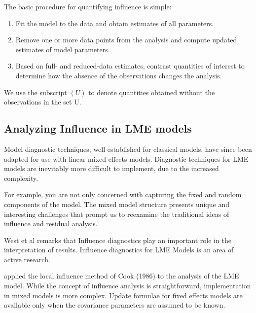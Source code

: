 \documentclass[12pt, a4paper]{report}
\theoremstyle{plain}
\theoremstyle{definition}
\theoremstyle{remark}
\begin{document}
	
	The basic procedure for quantifying influence is simple:
	\begin{enumerate}
		\item Fit the model to the data and obtain estimates of all parameters.
		\item Remove one or more data points from the analysis and compute updated estimates of model parameters.
		\item Based on full- and reduced-data estimates, contrast quantities of interest to determine how the absence
		of the observations changes the analysis.
	\end{enumerate}	
	
	
	We use the subscript $(U)$ to denote quantities obtained without the observations in the set U. 

\subsection{Analyzing Influence in LME models}

Model diagnostic techniques, well established for classical models, have since been adapted for use with linear mixed effects models. Diagnostic techniques for LME models are inevitably more difficult to implement, due to the increased complexity.



For example, you are not only concerned with capturing the fixed and random components of the model. The mixed model structure presents unique and interesting challenges that prompt us to reexamine the traditional ideas of influence and residual analysis.



West et al remarks that Influence diagnostics play an important role in the interpretation of results. Influence diagnostics for LME Models is an area of active research.

\citet{Beckman} applied the local influence method of Cook (1986) to the analysis of the LME model.
While the concept of influence analysis is straightforward, implementation in mixed models is more complex. Update formulae for fixed effects models are available only when the covariance parameters are assumed to be known.
\end{document}
